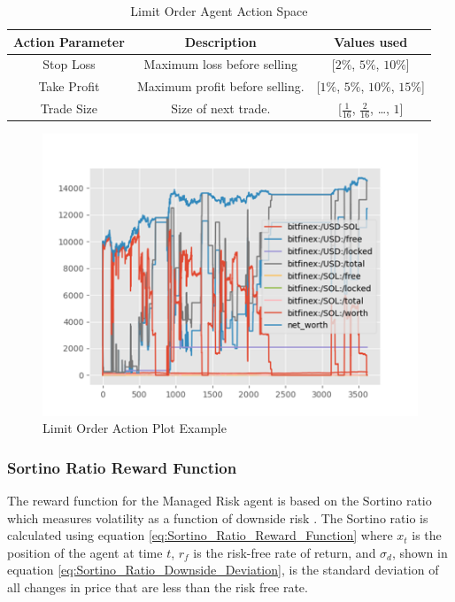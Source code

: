 \documentclass[journal]{new-aiaa}
\begin{document}
\begin{table}[hbt!]
        \centering
        \begin{tabular}{||c|c|c||}
                \hline
                \textbf{Action Parameter} & \textbf{Description} & \textbf{Values used} \\
                \hline
                \hline
                Stop Loss & Maximum loss before selling & [$2\%$, $5\%$, $10\%$] \\
                \hline
                Take Profit & Maximum profit before selling. & [$1\%$, $5\%$, $10\%$, $15\%$] \\
                \hline
                Trade Size & Size of next trade. & [$\frac{1}{16}$, $\frac{2}{16}$, \dots, $1$]\\
                \hline
        \end{tabular}
        \caption{Limit Order Agent Action Space}
        \label{tab:Limit_Order_Agent_Action_Space}
\end{table}

\begin{figure}[hbt!]
        \centering
        \includegraphics[width=.5\textwidth]{figures/Risk_action_example.png}
        \caption{Limit Order Action Plot Example}
        \label{fig:Limit Order Action Plot Example}
\end{figure}

\subsubsection{Sortino Ratio Reward Function}\label{sec:Model_Design:Managed_Risk_Agent:Sortino_Ratio_Reward_Function}
The reward function for the Managed Risk agent is based on the Sortino ratio which measures volatility as a function of downside risk \cite{sortino1994performance}.
The Sortino ratio is calculated using equation \ref{eq:Sortino_Ratio_Reward_Function} where $x_t$ is the position of the agent at time $t$, $r_f$ is the risk-free rate of return, and $\sigma_d$, shown in equation \ref{eq:Sortino_Ratio_Downside_Deviation}, is the standard deviation of all changes in price that are less than the risk free rate.
\end{document}
